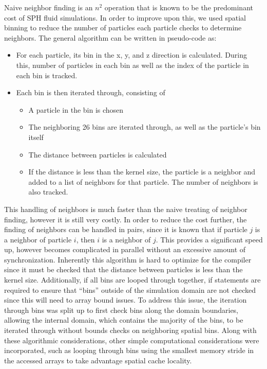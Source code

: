 \documentclass{scrartcl}
\begin{document}
  Naive neighbor finding is an $n^2$ operation that is known to be the predominant cost of SPH fluid simulations. In order to improve upon this, we used spatial binning to reduce the number of particles each particle checks to determine neighbors. The general algorithm can be written in pseudo-code as:
      \begin{itemize}
      	\item For each particle, its bin in the x, y, and z direction is calculated. During this, number of particles in each bin as well as the index of the particle in each bin is tracked.
      	\item Each bin is then iterated through, consisting of
	      	\begin{itemize}
	      		\item A particle in the bin is chosen
	      		\item The neighboring 26 bins are iterated through, as well as the particle's bin itself
	      		\item The distance between particles is calculated
	      		\item If the distance is less than the kernel size, the particle is a neighbor and added to a list of neighbors for that particle. The number of neighbors is also tracked.
	      	\end{itemize}
      \end{itemize}
   This handling of neighbors is much faster than the naive treating of neighbor finding, however it is still very costly. In order to reduce the cost further, the finding of neighbors can be handled in pairs, since it is known that if particle $j$ is a neighbor of particle $i$, then $i$ is a neighbor of $j$. This provides a significant speed up, however becomes complicated in parallel without an excessive amount of synchronization. Inherently this algorithm is hard to optimize for the compiler since it must be checked that the distance between particles is less than the kernel size. Additionally, if all bins are looped through together, if statements are required to ensure that ``bins'' outside of the simulation domain are not checked since this will need to array bound issues. To address this issue, the iteration through bins was split up to first check bins along the domain boundaries, allowing the internal domain, which contains the majority of the bins, to be iterated through without bounds checks on neighboring spatial bins. Along with these algorithmic considerations, other simple computational considerations were incorporated, such as looping through bins using the smallest memory stride in the accessed arrays to take advantage spatial cache locality.
   
\end{document}
